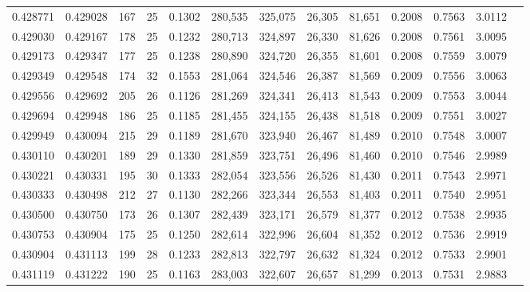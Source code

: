 \begin{tabular}{rrrrrrrrrrrrr}
0.428771 & 0.429028 &   167 &  25 &                                     0.1302 & 280,535 & 325,075 &  26,305 &  81,651 & 0.2008 & 0.7563 & 3.0112 \\
0.429030 & 0.429167 &   178 &  25 &                                     0.1232 & 280,713 & 324,897 &  26,330 &  81,626 & 0.2008 & 0.7561 & 3.0095 \\
0.429173 & 0.429347 &   177 &  25 &                                     0.1238 & 280,890 & 324,720 &  26,355 &  81,601 & 0.2008 & 0.7559 & 3.0079 \\
0.429349 & 0.429548 &   174 &  32 &                                     0.1553 & 281,064 & 324,546 &  26,387 &  81,569 & 0.2009 & 0.7556 & 3.0063 \\
0.429556 & 0.429692 &   205 &  26 &                                     0.1126 & 281,269 & 324,341 &  26,413 &  81,543 & 0.2009 & 0.7553 & 3.0044 \\
0.429694 & 0.429948 &   186 &  25 &                                     0.1185 & 281,455 & 324,155 &  26,438 &  81,518 & 0.2009 & 0.7551 & 3.0027 \\
0.429949 & 0.430094 &   215 &  29 &                                     0.1189 & 281,670 & 323,940 &  26,467 &  81,489 & 0.2010 & 0.7548 & 3.0007 \\
0.430110 & 0.430201 &   189 &  29 &                                     0.1330 & 281,859 & 323,751 &  26,496 &  81,460 & 0.2010 & 0.7546 & 2.9989 \\
0.430221 & 0.430331 &   195 &  30 &                                     0.1333 & 282,054 & 323,556 &  26,526 &  81,430 & 0.2011 & 0.7543 & 2.9971 \\
0.430333 & 0.430498 &   212 &  27 &                                     0.1130 & 282,266 & 323,344 &  26,553 &  81,403 & 0.2011 & 0.7540 & 2.9951 \\
0.430500 & 0.430750 &   173 &  26 &                                     0.1307 & 282,439 & 323,171 &  26,579 &  81,377 & 0.2012 & 0.7538 & 2.9935 \\
0.430753 & 0.430904 &   175 &  25 &                                     0.1250 & 282,614 & 322,996 &  26,604 &  81,352 & 0.2012 & 0.7536 & 2.9919 \\
0.430904 & 0.431113 &   199 &  28 &                                     0.1233 & 282,813 & 322,797 &  26,632 &  81,324 & 0.2012 & 0.7533 & 2.9901 \\
0.431119 & 0.431222 &   190 &  25 &                                     0.1163 & 283,003 & 322,607 &  26,657 &  81,299 & 0.2013 & 0.7531 & 2.9883 \\

\end{tabular}
